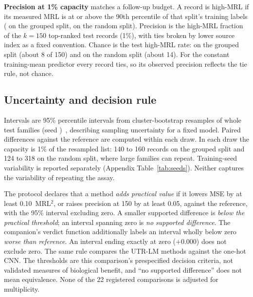 \documentclass[11pt]{article}
\begin{document}
\textbf{Precision at 1\% capacity} matches a follow-up budget. A record is high-MRL if its measured MRL is at or
above the 90th percentile of that split's training labels (\GrpCut{} on the grouped split, \RandCut{} on the random
split). Precision is the high-MRL fraction of the $k = 150$ top-ranked test records (1\%), with ties broken by lower
source index as a fixed convention. Chance is the test high-MRL rate: \GrpBase{} on the grouped split (about 8 of
150) and \RandBase{} on the random split (about 14). For the constant training-mean predictor every record ties, so
its observed precision reflects the tie rule, not chance.

\subsection{Uncertainty and decision rule}\label{sec:stats}
Intervals are 95\% percentile intervals from \Boot{} cluster-bootstrap resamples of whole test families (seed
\BootSeed)~\citep{field2007}, describing sampling uncertainty for a fixed model. Paired differences against the
reference are computed within each draw. In each draw the capacity is 1\% of the resampled list: 140 to 160 records
on the grouped split and 124 to 318 on the random split, where large families can repeat. Training-seed
variability is reported separately (Appendix Table~\ref{tab:seeds}). Neither captures the variability of repeating
the assay.

The protocol declares that a method \emph{adds practical value} if it lowers MSE by at least 0.10~MRL$^2$, or raises
precision at 150 by at least 0.05, against the reference, with the 95\% interval excluding zero. A smaller
supported difference is \emph{below the practical threshold}; an interval spanning zero is \emph{no supported
difference}. The companion's verdict function additionally labels an interval wholly below zero \emph{worse than
reference}. An interval ending exactly at zero
($+0.000$) does not exclude zero. The same rule compares the UTR-LM methods against the one-hot CNN. The thresholds
are this comparison's prespecified decision criteria, not validated measures of biological benefit, and ``no
supported difference'' does not mean equivalence. None of the 22 registered comparisons is adjusted for
multiplicity.
\end{document}
